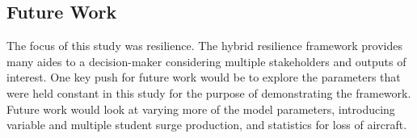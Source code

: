 \documentclass[preprint,12pt]{elsarticle}
\begin{document}



\subsection{Future Work}

The focus of this study was resilience. The hybrid resilience
framework provides many aides to a decision-maker considering multiple
stakeholders and outputs of interest.
One key push for future work would be to explore the parameters that
were held constant in this study for the purpose of demonstrating the
framework. Future work would look at varying more of the model parameters,
introducing variable and multiple student surge production, and
statistics for loss of aircraft. 

% 
% 
% 
% 

\end{document}
